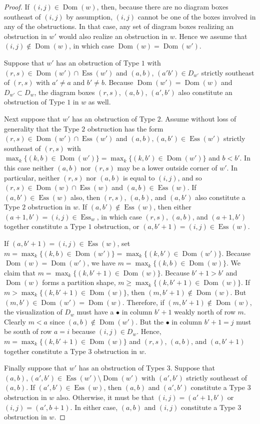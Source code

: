 \documentclass[ALCO,Unicode,published]{cedram}
\DeclareMathOperator{\Ess}{Ess}
\DeclareMathOperator{\Dom}{Dom}
\begin{document}
\begin{proof}
If $(i,j) \in \Dom(w)$, then, because there are no diagram boxes southeast of $(i,j)$ by assumption, $(i,j)$ cannot be one of the boxes involved in any of the obstructions.  In that case, any set of diagram boxes realizing an obstruction in $w'$ would also realize an obstruction in $w$.  Hence we assume that $(i,j) \notin \Dom(w)$, in which case $\Dom(w) = \Dom(w')$.

Suppose that $w'$ has an obstruction of Type $1$ with $(r,s) \in \Dom(w') \cap \Ess(w')$ and $(a,b)$, $(a'b') \in D_{w'}$ strictly southeast of $(r,s)$ with $a' \neq a$ and $b' \neq b$.  Because $\Dom(w') = \Dom(w)$ and $D_{w'} \subset D_w$, the diagram boxes $(r,s)$, $(a,b)$, $(a',b')$ also constitute an obstruction of Type $1$ in $w$ as well.

Next suppose that $w'$ has an obstruction of Type $2$.  Assume without loss of generality that the Type $2$ obstruction has the form  $(r,s) \in \Dom(w') \cap \Ess(w')$ and $(a,b), (a,b') \in \Ess(w')$ strictly southeast of $(r,s)$ with $\max_k \{(k,b) \in \Dom(w')\} = \max_k \{(k,b') \in \Dom(w') \}$ and $b<b'$.  In this case neither $(a,b)$ nor $(r,s)$ may be a lower outside corner of $w'$.   In particular, neither $(r,s)$ nor $(a,b)$ is equal to $(i,j)$, and so $(r,s) \in \Dom(w) \cap \Ess(w)$ and $(a,b) \in \Ess(w)$.  If $(a,b') \in \Ess(w)$ also, then $(r,s)$, $(a,b)$, and $(a,b')$ also constitute a Type $2$ obstruction in $w$.  If $(a,b') \notin \Ess(w)$, then either $(a+1,b') = (i,j) \in \Ess_w$, in which case $(r,s)$, $(a,b)$, and $(a+1,b')$ together constitute a Type $1$ obstruction, or $(a,b'+1) = (i,j) \in \Ess(w)$.  

If $(a,b'+1) = (i,j) \in \Ess(w)$, set $m = \max_k \{(k,b) \in \Dom(w')\} = \max_k \{(k,b') \in \Dom(w')\}$.  Because $\Dom(w) = \Dom(w')$, we have $m = \max_k \{(k,b) \in \Dom(w)\}$.  We claim that $m = \max_k \{(k,b'+1) \in \Dom(w)\}$.   Because $b'+1>b'$ and $\Dom(w)$ forms a partition shape, $m \geq \max_k \{(k,b'+1) \in \Dom(w)\}$.  If $m > \max_k \{(k,b'+1) \in \Dom(w)\}$, then $(m,b'+1) \notin \Dom(w)$.  But $(m,b') \in \Dom(w') = \Dom(w)$.  Therefore, if $(m,b'+1) \notin \Dom(w)$, the visualization of $D_w$ must have a $\bullet$ in column $b'+1$ weakly north of row $m$.  Clearly $m<a$ since $(a,b) \notin \Dom(w')$.  But the $\bullet$ in column $b'+1 = j$ must be south of row $a = i$ because $(i,j) \in D_w$. Hence, $m = \max_k \{(k,b'+1) \in \Dom(w)\}$ and $(r,s)$, $(a,b)$, and $(a, b'+1)$ together constitute a Type $3$ obstruction in $w$. 

Finally suppose that $w'$ has an obstruction of Types $3$.  Suppose that $(a,b), (a',b') \in \Ess(w') \setminus \Dom(w')$ with $(a',b')$ strictly southeast of $(a,b)$.  If $(a',b') \in \Ess(w)$, then $(a,b)$ and $(a',b')$ constitute a Type $3$ obstruction in $w$ also.  Otherwise, it must be that $(i,j) = (a'+1,b')$ or $(i,j) = (a',b+1)$.  In either case, $(a,b)$ and $(i,j)$ constitute a Type $3$ obstruction in $w$.
\end{proof}
\end{document}
